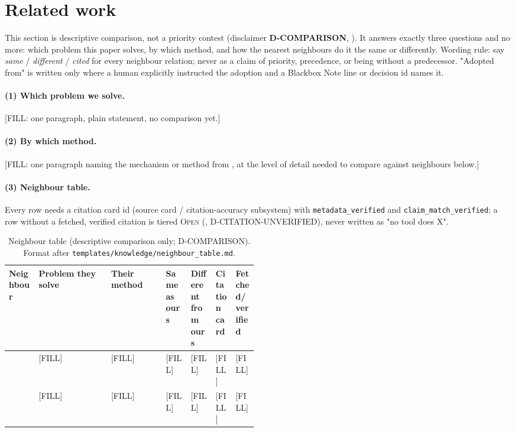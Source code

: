 \documentclass[11pt]{article}
\newcommand{\OpenTier}{\textsc{Open}}
\begin{document}
\section{Related work}
\label{sec:related}
This section is descriptive comparison, not a priority contest (disclaimer
\textbf{D-COMPARISON}, ). It answers exactly three
questions and no more: which problem this paper solves, by which method, and
how the nearest neighbours do it the same or differently. Wording rule: say
\emph{same} / \emph{different} / \emph{cited} for every neighbour relation;
never as a claim of priority, precedence, or being without a predecessor.
"Adopted from" is written only where a human explicitly instructed the
adoption and a Blackbox Note line or decision id names it.

\paragraph{(1) Which problem we solve.} [FILL: one paragraph, plain
statement, no comparison yet.]

\paragraph{(2) By which method.} [FILL: one paragraph naming the mechanism
or method from , at the level of detail needed to compare
against neighbours below.]

\paragraph{(3) Neighbour table.} Every row needs a citation card id (source
card / citation-accuracy subsystem) with \texttt{metadata\_verified} and
\texttt{claim\_match\_verified}; a row without a fetched, verified citation
is tiered \OpenTier{} (, D-CITATION-UNVERIFIED), never
written as "no tool does X".

\begin{table}[H]
\centering
\scriptsize
\begin{tabularx}{\linewidth}{@{}p{0.12\linewidth} X X p{0.1\linewidth} p{0.1\linewidth} p{0.08\linewidth} p{0.09\linewidth}@{}}
\toprule
\textbf{Neighbour} & \textbf{Problem they solve} & \textbf{Their method} & \textbf{Same as ours} & \textbf{Different from ours} & \textbf{Citation card} & \textbf{Fetched/verified} \\
\midrule
\citet{schaffer2005contrastive} & [FILL] & [FILL] & [FILL] & [FILL] & [FILL] & [FILL] \\
\citet{jaakkola2020designing} & [FILL] & [FILL] & [FILL] & [FILL] & [FILL] & [FILL] \\
\bottomrule
\end{tabularx}
\caption{Neighbour table (descriptive comparison only;  D-COMPARISON). Format after \texttt{templates/knowledge/neighbour\_table.md}.}
\label{tab:neighbours}
\end{table}
\end{document}
